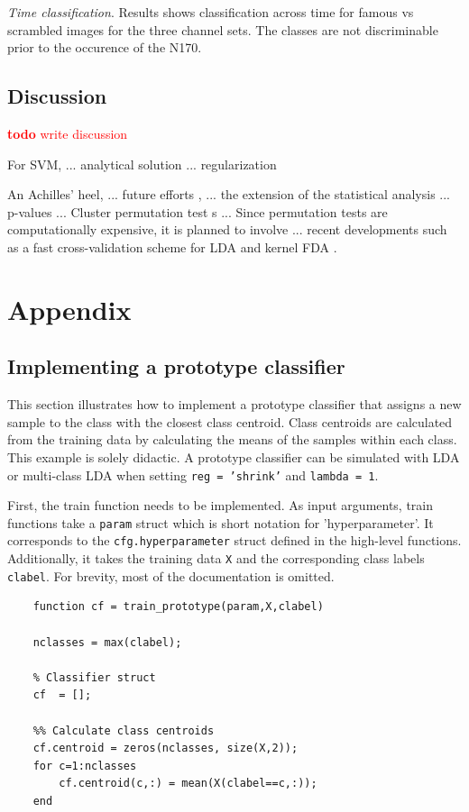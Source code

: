 \documentclass[utf8]{frontiersSCNS} %
\newcommand{\ttt}[1]{\texttt{#1}}
\newcommand{\todo}[1]{\textcolor{red}{\textbf{todo} #1}}
\begin{document}
\textit{Time classification}. Results shows classification across time for famous vs scrambled images for the three channel sets. The classes are not discriminable prior to the occurence of the N170. 


\subsection{Discussion}


\todo{write discussion}

For SVM, ... analytical solution ... regularization \citep{Hastie2004TheMachine}


An Achilles' heel, ... future efforts , ... the extension of the statistical analysis ... p-values ... Cluster permutation test s ... Since permutation tests are computationally expensive, it is planned to involve ... recent developments such as a fast cross-validation scheme for LDA and kernel FDA \citep{Treder2019DirectFDA}.

\section{Appendix}

\subsection{Implementing a prototype classifier}

This section illustrates how to implement a prototype classifier that assigns a new sample to the class with the closest class centroid. Class centroids are calculated from the training data by calculating the means of the samples within each class. This example is solely didactic. A prototype classifier can be simulated with LDA or multi-class LDA when setting \ttt{reg = 'shrink'} and \ttt{lambda = 1}.

First, the train function needs to be implemented. As input arguments, train functions take a \ttt{param} struct which is short notation for 'hyperparameter'. It corresponds to the \ttt{cfg.hyperparameter} struct defined in the high-level functions. Additionally, it takes the training data \ttt{X} and the corresponding class labels \ttt{clabel}. For brevity, most of the documentation is omitted.

\begin{verbatim}
    function cf = train_prototype(param,X,clabel)

    nclasses = max(clabel);

    % Classifier struct
    cf  = [];

    %% Calculate class centroids
    cf.centroid = zeros(nclasses, size(X,2));
    for c=1:nclasses
        cf.centroid(c,:) = mean(X(clabel==c,:));
    end
\end{verbatim}
\end{document}
